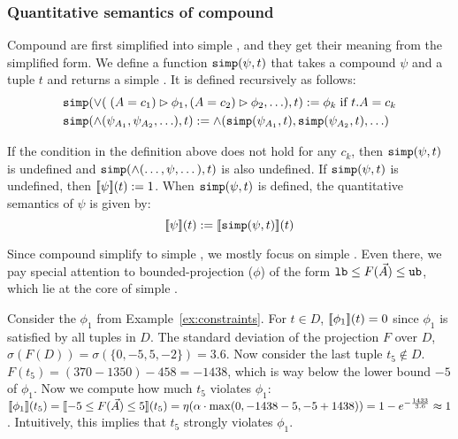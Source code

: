 \subsubsection*{Quantitative semantics of compound \invariants} 
Compound \invariants are first simplified into simple \invariants, and they get
their meaning from the simplified form.
We define a function
$\mathtt{simp}(\psi, t)$ that takes a compound \invariant $\psi$ and a tuple $t$ and returns a simple
\invariant. It is defined recursively as follows:
\begin{align*}
    &\mathtt{simp}(\vee(\;(A = c_1) \rhd\phi_1, (A = c_2) \rhd \phi_2,\ldots), t) := 
      \phi_k  \; \mbox{if $t.A = c_k$}
    \\
    &\mathtt{simp}(\wedge(\psi_{A_1}, \psi_{A_2},\ldots), t)  := \wedge(\mathtt{simp}(\psi_{A_1}, t), \mathtt{simp}(\psi_{A_2},t),\ldots)
\end{align*}
%
\begin{sloppypar} If the condition in the definition above does not hold for any $c_k$, then
$\mathtt{simp}(\psi,t)$ is undefined and $\mathtt{simp}(\wedge(\dots,\psi,\dots),t)$ is
also undefined. If $\mathtt{simp}(\psi,t)$ is undefined, then ${[\![{\psi}]\!]}(t) :=
1$. When $\mathtt{simp}(\psi,t)$ is defined, the quantitative semantics of $\psi$ is
given by:
$$
{[\![{\psi}]\!]}(t) := {[\![{\mathtt{simp}(\psi,t)}]\!]}(t)
$$
\end{sloppypar}

Since compound \invariants simplify to simple \invariants, we mostly focus on 
simple \invariants. Even there, we pay special attention to bounded-projection 
\invariants ($\phi$) of the form \linebreak ${\mathtt{lb}} \le F(\vec{A}) \le {\mathtt{ub}}$, which lie at the core of simple \invariants. 


\begin{example}\label{ex:semantics}
    Consider the \invariant $\phi_1$ from Example~\ref{ex:constraints}.
	For $t \in D$,
    ${[\![{\phi_1}]\!]}(t)= 0$ since $\phi_1$ is satisfied by all tuples in $D$. The
    standard deviation of the projection $F$ over $D$, $\sigma(F(D)) {=}
    \sigma(\{0,-5, 5, -2\}) {=} 3.6$. Now consider the last tuple $t_5 \not\in
    D$. $F(t_5) = (370 - 1350)-458 = -1438$, which is way below the lower bound $-5$ of $\phi_1$. 
	Now we compute how much $t_5$ violates $\phi_1$: 
	${[\![{\phi_1}]\!]}(t_5) = {[\![{-5 \leq F(\vec{A}) \leq 5}]\!]}(t_5) 
		 			   = \eta(\alpha \cdot \max(0, -1438 - 5, -5 + 1438)) = 1 - e^{-\frac{1433}{3.6}} \approx 1$.
	Intuitively, this implies that $t_5$ strongly violates $\phi_1$.
\end{example}


